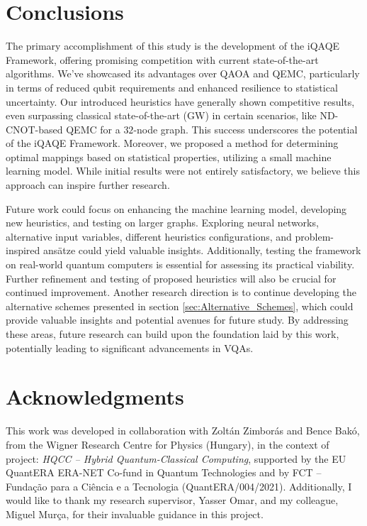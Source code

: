 \section{Conclusions}
\label{sec:Conclusions}
The primary accomplishment of this study is the development of the iQAQE Framework, offering promising competition with current state-of-the-art algorithms. We've showcased its advantages over QAOA and QEMC, particularly in terms of reduced qubit requirements and enhanced resilience to statistical uncertainty. Our introduced heuristics have generally shown competitive results, even surpassing classical state-of-the-art (GW) in certain scenarios, like ND-CNOT-based QEMC for a $32$-node graph. This success underscores the potential of the iQAQE Framework. Moreover, we proposed a method for determining optimal mappings based on statistical properties, utilizing a small machine learning model. While initial results were not entirely satisfactory, we believe this approach can inspire further research.

Future work could focus on enhancing the machine learning model, developing new heuristics, and testing on larger graphs. Exploring neural networks, alternative input variables, different heuristics configurations, and problem-inspired ansätze could yield valuable insights. Additionally, testing the framework on real-world quantum computers is essential for assessing its practical viability. Further refinement and testing of proposed heuristics will also be crucial for continued improvement. Another research direction is to continue developing the alternative schemes presented in section \ref{sec:Alternative_Schemes}, which could provide valuable insights and potential avenues for future study. By addressing these areas, future research can build upon the foundation laid by this work, potentially leading to significant advancements in VQAs.


\section*{Acknowledgments}
\label{sec:Acknowledgments}
This work was developed in collaboration with Zoltán Zimborás and Bence Bakó, from the Wigner Research Centre for Physics (Hungary), in the context of project: \textit{HQCC – Hybrid Quantum-Classical Computing}, supported by the EU QuantERA ERA-NET Co-fund in Quantum Technologies and by FCT -- Funda\c{c}\~{a}o para a Ci\^{e}ncia e a Tecnologia (QuantERA/004/2021). Additionally, I would like to thank my research supervisor, Yasser Omar, and my colleague, Miguel Murça, for their invaluable guidance in this project.

